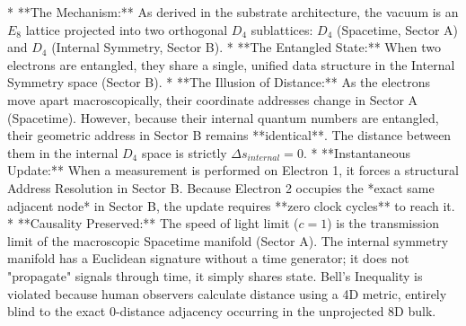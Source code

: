 *   **The Mechanism:** As derived in the substrate architecture, the vacuum is an $E_8$ lattice projected into two orthogonal $D_4$ sublattices: $D_4$ (Spacetime, Sector A) and $D_4$ (Internal Symmetry, Sector B).
*   **The Entangled State:** When two electrons are entangled, they share a single, unified data structure in the Internal Symmetry space (Sector B). 
*   **The Illusion of Distance:** As the electrons move apart macroscopically, their coordinate addresses change in Sector A (Spacetime). However, because their internal quantum numbers are entangled, their geometric address in Sector B remains **identical**. The distance between them in the internal $D_4$ space is strictly $\Delta s_{internal} = 0$.
*   **Instantaneous Update:** When a measurement is performed on Electron 1, it forces a structural Address Resolution in Sector B. Because Electron 2 occupies the *exact same adjacent node* in Sector B, the update requires **zero clock cycles** to reach it. 
*   **Causality Preserved:** The speed of light limit ($c=1$) is the transmission limit of the macroscopic Spacetime manifold (Sector A). The internal symmetry manifold has a Euclidean signature without a time generator; it does not "propagate" signals through time, it simply shares state. Bell's Inequality is violated because human observers calculate distance using a 4D metric, entirely blind to the exact 0-distance adjacency occurring in the unprojected 8D bulk.
